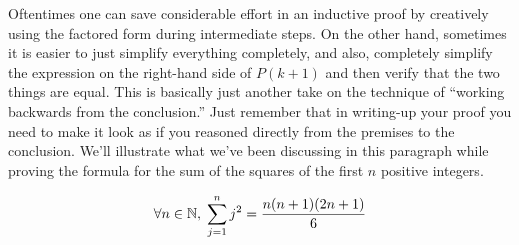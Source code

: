 Oftentimes one can save considerable effort in an inductive 
proof by creatively using the factored form during intermediate steps.
On the other hand, sometimes it is easier to just simplify everything
completely, and also, completely simplify the expression on the 
right-hand side of $P(k+1)$ and then verify that the two things are
equal.  This is basically just another take on the technique of 
``working backwards from the conclusion.''  Just remember that 
in writing-up your proof you need to make it look as if you reasoned
directly from the premises to the conclusion.  We'll illustrate
what we've been discussing in this paragraph while proving
the formula for the sum of the squares of the first $n$ positive integers.

\begin{thm}
\[ \forall n \in {\mathbb N}, \; \sum_{j=1}^n j^2 = \frac{n(n+1)(2n+1)}{6} \]
\end{thm}

